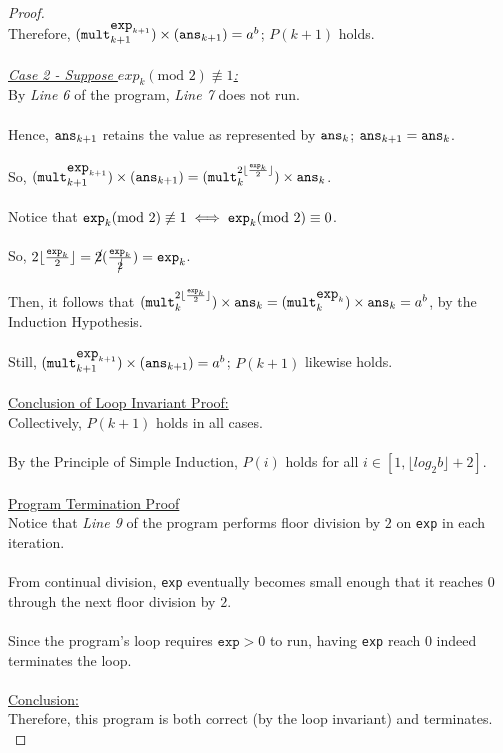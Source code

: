 \documentclass[12pt]{article}
\begin{document}
\begin{proof}
    \\
    Therefore, \((\verb|mult|_{k + 1}^{\verb|exp|_{k + 1}}) \times (\verb|ans|_{k + 1}) = a^b\); $P(k + 1)$ holds. \\
    \\
    \underline{\textit{Case 2 - Suppose \(exp_k (\text{mod } 2) \not\equiv 1\):}} \\
    By \textit{Line 6} of the program, \textit{Line 7} does not run. \\
    \\
    Hence, $\verb|ans|_{k + 1}$ retains the value as represented by $\verb|ans|_k$; \(\verb|ans|_{k + 1} = \verb|ans|_k\). \\
    \\
    So, \((\verb|mult|_{k + 1}^{\verb|exp|_{k + 1}}) \times (\verb|ans|_{k + 1}) = (\verb|mult|_k^{2 \lfloor \frac{\texttt{exp}_k}{2} \rfloor}) \times \verb|ans|_k\). \\
    \\
    Notice that \(\verb|exp|_k (\text{mod } 2) \not\equiv 1 \iff \verb|exp|_k (\text{mod } 2) \equiv 0\). \\
    \\
    So, \(2 \lfloor \frac{\texttt{exp}_k}{2} \rfloor = \cancel{2} (\frac{\texttt{exp}_k}{\cancel{2}}) = \verb|exp|_k\). \\
    \\
    Then, it follows that \((\verb|mult|_k^{2 \lfloor \frac{\texttt{exp}_k}{2} \rfloor}) \times \verb|ans|_k = (\verb|mult|_k^{\verb|exp|_k}) \times \verb|ans|_k = a^b\), by the Induction Hypothesis. \\
    \\
    Still, \((\verb|mult|_{k + 1}^{\verb|exp|_{k + 1}}) \times (\verb|ans|_{k + 1}) = a^b\); $P(k + 1)$ likewise holds. \\
    \\
    \underline{Conclusion of Loop Invariant Proof:} \\
    Collectively, $P(k + 1)$ holds in all cases. \\
    \\
    By the Principle of Simple Induction, $P(i)$ holds for all $i \in [1, \lfloor log_2b \rfloor + 2]$. \\
    \\
    \underline{Program Termination Proof} \\
    Notice that \textit{Line 9} of the program performs floor division by $2$ on \texttt{exp} in each iteration. \\
    \\
    From continual division, \texttt{exp} eventually becomes small enough that it reaches $0$ through the next floor division by $2$. \\
    \\
    Since the program's loop requires $\texttt{exp} > 0$ to run, having \texttt{exp} reach $0$ indeed terminates the loop. \\
    \\
    \underline{Conclusion:} \\
    Therefore, this program is both correct (by the loop invariant) and terminates. \\
\end{proof}
\end{document}
